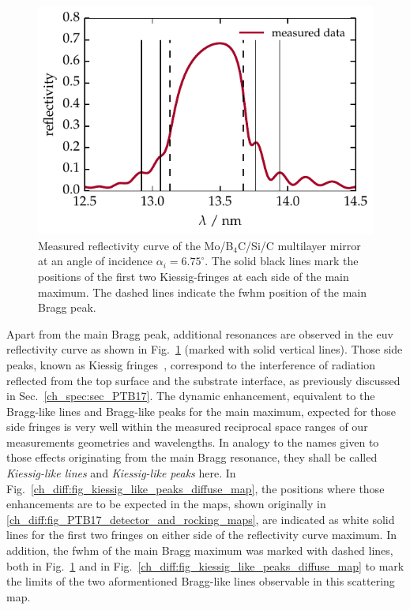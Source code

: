 \begin{figure}[htbp]
        \includegraphics{img/kiessig_like_peaks_reflectivity_curve} \caption[Measured reflectivity curve of the Mo/B$_4$C/Si/C multilayer mirror.]{Measured reflectivity curve of the Mo/B$_4$C/Si/C multilayer mirror at an angle of incidence $\alpha_i = 6.75^\circ$. The solid black lines mark the positions of the first two Kiessig-fringes at each side of the main maximum. The dashed lines indicate the \gls{fwhm} position of the main Bragg peak.}
        \label{ch_diff:fig_ptb17_reflectance_AOI_675} 
\end{figure}
Apart from the main Bragg peak, additional resonances are observed in the \gls{euv} reflectivity curve as shown in Fig.~\ref{ch_diff:fig_ptb17_reflectance_AOI_675} (marked with solid vertical lines). Those side peaks, known as Kiessig fringes~\cite{kiessig_interferenz_1931}, correspond to the interference of radiation reflected from the top surface and the substrate interface, as previously discussed in Sec.~\ref{ch_spec:sec_PTB17}. The dynamic enhancement, equivalent to the Bragg-like lines and Bragg-like peaks for the main maximum, expected for those side fringes is very well within the measured reciprocal space ranges of our measurements geometries and wavelengths. In analogy to the names given to those effects originating from the main Bragg resonance, they shall be called \emph{Kiessig-like lines} and \emph{Kiessig-like peaks} here. In Fig.~\ref{ch_diff:fig_kiessig_like_peaks_diffuse_map}, the positions where those enhancements are to be expected in the maps, shown originally in \ref{ch_diff:fig_PTB17_detector_and_rocking_maps}, are indicated as white solid lines for the first two fringes on either side of the reflectivity curve maximum. In addition, the \gls{fwhm} of the main Bragg maximum was marked with dashed lines, both in Fig.~\ref{ch_diff:fig_ptb17_reflectance_AOI_675} and in Fig.~\ref{ch_diff:fig_kiessig_like_peaks_diffuse_map} to mark the limits of the two aformentioned Bragg-like lines observable in this scattering map.
